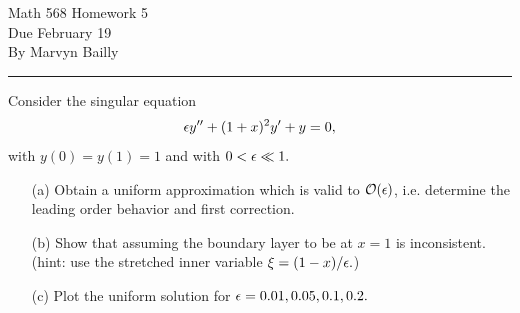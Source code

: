 \documentclass[12pt]{report}
\begin{document}
\large

\begin{center}
 Math 568 Homework 5\\
 Due February 19\\
 By Marvyn Bailly\\
\end{center}

\normalsize

\hrule



\begin{problem}
    Consider the singular equation
    \[
        {\epsilon} y'' + (1+x)^2y' + y = 0,   
    \]
    with $y(0) = y(1) = 1$ and with $0 < {\epsilon} \ll 1.$
    \begin{enumerate}
        \item [(a)] Obtain a uniform approximation which is valid to ${\mathcal{O}}({\epsilon})$, i.e. determine the leading order behavior and first correction.
        \item [(b)] Show that assuming the boundary layer to be at $x = 1$ is inconsistent. (hint: use the stretched inner variable $\xi = (1 - x)/{\epsilon}.$)
        \item [(c)] Plot the uniform solution for ${\epsilon} = 0.01,0.05,0.1,0.2.$
    \end{enumerate}
\end{problem}
\end{document}
